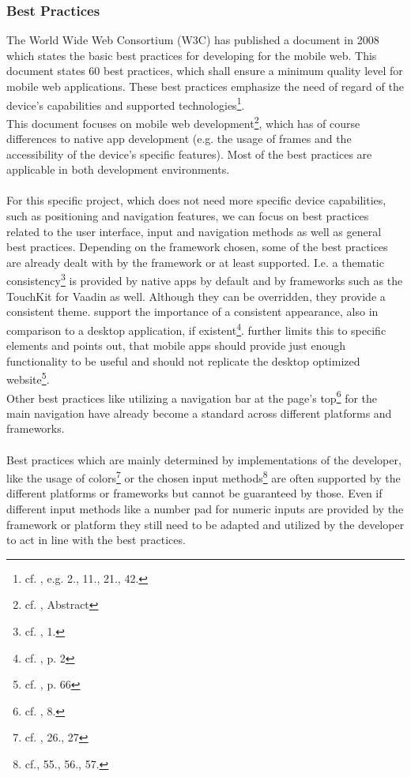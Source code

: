 \subsubsection{Best Practices}
The World Wide Web Consortium (W3C) has published a document in 2008 which states the basic best practices for developing for the mobile web. This document states 60 best practices, which shall ensure a minimum quality level for mobile web applications. These best practices emphasize the need of regard of the device's capabilities and supported technologies\footnote{cf. \cite{WorldWideWebConsortium.2008}, e.g. 2., 11., 21., 42.}. 
\\
This document focuses on mobile web development\footnote{cf. \cite{WorldWideWebConsortium.2008}, Abstract}, which has of course differences to native app development (e.g. the usage of frames and the accessibility of the device's specific features). Most of the best practices are applicable in both development environments.
\\
\\
For this specific project, which does not need more specific device capabilities, such as positioning and navigation features, we can focus on best practices related to the user interface, input and navigation methods as well as general best practices. Depending on the framework chosen, some of the best practices are already dealt with by the framework or at least supported. I.e. a thematic consistency\footnote{cf. \cite{WorldWideWebConsortium.2008}, 1.} is provided by native apps by default and by frameworks such as the TouchKit for Vaadin as well. Although they can be overridden, they provide a consistent theme. \cite{Wessels.2011} support the importance of a consistent appearance, also in comparison to a desktop application, if existent\footnote{cf. \cite{Wessels.2011}, p. 2}. \cite{Lica.2010} further limits this to specific elements and points out, that mobile apps should provide just enough functionality to be useful and should not replicate the desktop optimized website\footnote{cf. \cite{Lica.2010}, p. 66}.
\\
Other best practices like utilizing a navigation bar at the page's top\footnote{cf. \cite{WorldWideWebConsortium.2008}, 8.} for the main navigation have already become a standard across different platforms and frameworks.
\\
\\
Best practices which are mainly determined by implementations of the developer, like the usage of colors\footnote{cf. \cite{WorldWideWebConsortium.2008}, 26., 27} or the chosen input methods\footnote{cf.\cite{WorldWideWebConsortium.2008}, 55., 56., 57.} are often supported by the different platforms or frameworks but cannot be guaranteed by those. Even if different input methods like a number pad for numeric inputs are provided by the framework or platform they still need to be adapted and utilized by the developer to act in line with the best practices.
